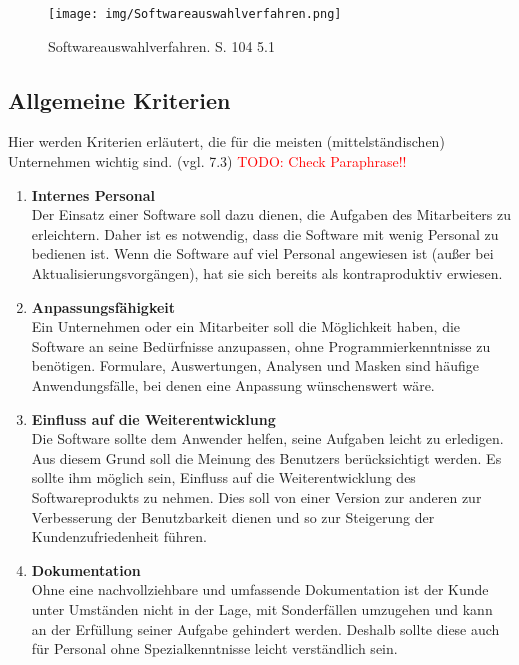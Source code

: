 \documentclass[11pt]{scrartcl}       %
\begin{document}
\begin{figure}[!htb]
	\centering
	\texttt{[image: img/Softwareauswahlverfahren.png]}
	\caption{Softwareauswahlverfahren. \cite{teich2008richtige} S. 104 5.1}
\label{fig:qms_principles}
\end{figure}

\subsection{Allgemeine Kriterien}
Hier werden Kriterien erläutert, die für die meisten (mittelständischen) Unternehmen wichtig sind. (vgl. \cite{gross2017professionelle} 7.3) \textcolor{red}{TODO: Check Paraphrase!!}
\begin{enumerate}

\item[] \textbf{Internes Personal} \\
Der Einsatz einer Software soll dazu dienen, die Aufgaben des Mitarbeiters zu erleichtern. Daher ist es notwendig, dass die Software mit wenig Personal zu bedienen ist. Wenn die Software auf viel Personal angewiesen ist (außer bei Aktualisierungsvorgängen), hat sie sich bereits als kontraproduktiv erwiesen.

\item[] \textbf{Anpassungsfähigkeit} \\
Ein Unternehmen oder ein Mitarbeiter soll die Möglichkeit haben, die Software an seine Bedürfnisse anzupassen, ohne Programmierkenntnisse zu benötigen. Formulare, Auswertungen, Analysen und Masken sind häufige Anwendungsfälle, bei denen eine Anpassung wünschenswert wäre. 

\item[] \textbf{Einfluss auf die Weiterentwicklung} \\
Die Software sollte dem Anwender helfen, seine Aufgaben leicht zu erledigen. Aus diesem Grund soll die Meinung des Benutzers berücksichtigt werden. Es sollte ihm möglich sein, Einfluss auf die Weiterentwicklung des Softwareprodukts zu nehmen. Dies soll von einer Version zur anderen zur Verbesserung der Benutzbarkeit dienen und so zur Steigerung der Kundenzufriedenheit führen.

\item[] \textbf{Dokumentation} \\
Ohne eine nachvollziehbare und umfassende Dokumentation ist der Kunde unter Umständen nicht in der Lage, mit Sonderfällen umzugehen und kann an der Erfüllung seiner Aufgabe gehindert werden. Deshalb sollte diese auch für Personal ohne Spezialkenntnisse leicht verständlich sein.


\end{enumerate}
\end{document}
